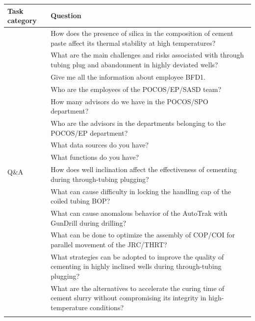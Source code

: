             
            \begin{table}[h]
                \centering
                \scriptsize
                \sloppy
                \begin{tabular}{|p{.1\linewidth}|p{.9\linewidth}|}
                \hline
                \textbf{Task category} & \textbf{Question} \\   \hline
                \multirow{17}{*}{Q\&A} & How does the presence of silica in the composition of cement 
                paste affect its thermal stability at high temperatures? \\ \cline{2-2}
                & What are the main challenges and risks associated with through tubing plug and abandonment in highly deviated wells? \\ \cline{2-2}
                & Give me all the information about employee BFD1. \\ \cline{2-2}
                & Who are the employees of the POCOS/EP/SASD team? \\ \cline{2-2}
                & How many advisors do we have in the POCOS/SPO department? \\ \cline{2-2}
                & Who are the advisors in the departments belonging to the POCOS/EP department? \\ \cline{2-2}
                & What data sources do you have? \\ \cline{2-2}
                & What functions do you have? \\ \cline{2-2}
                & How does well inclination affect the effectiveness of cementing during through-tubing plugging? \\ \cline{2-2}
                & What can cause difficulty in locking the handling cap of the coiled tubing BOP? \\ \cline{2-2}
                & What can cause anomalous behavior of the AutoTrak with GunDrill during drilling? \\ \cline{2-2}
                & What can be done to optimize the assembly of COP/COI for parallel movement of the JRC/THRT? \\ \cline{2-2}
                & What strategies can be adopted to improve the quality of cementing in highly inclined wells during through-tubing plugging? \\ \cline{2-2}
                & What are the alternatives to accelerate the curing time of cement slurry without compromising its integrity in high-temperature conditions? \\ \cline{2-2}

\end{tabular}
\end{table}
